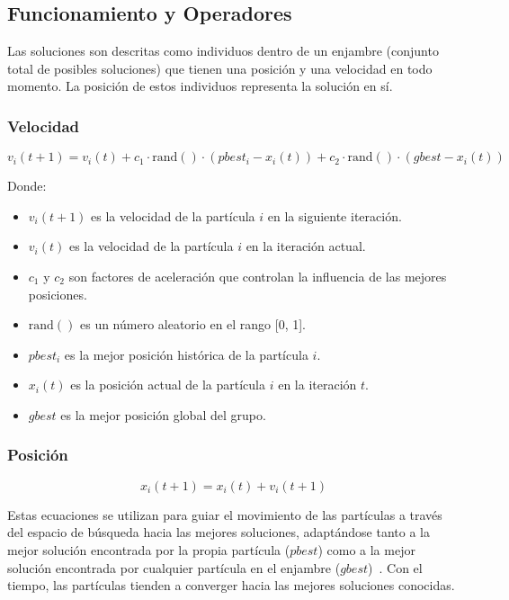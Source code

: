 \subsection{Funcionamiento y Operadores}
Las soluciones son descritas como individuos dentro de un enjambre (conjunto total de posibles soluciones) que tienen una posición y una velocidad en todo momento. La posición de estos individuos representa la solución en sí.

\subsubsection{Velocidad}
\begin{equation}
    v_{i}(t+1) = v_{i}(t) + c_1 \cdot \text{rand}() \cdot (pbest_{i} - x_{i}(t))+ c_2 \cdot \text{rand}() \cdot (gbest - x_{i}(t))
\end{equation}

Donde:
\begin{itemize}
    \item $v_{i}(t+1)$ es la velocidad de la partícula $i$ en la siguiente iteración.
    \item $v_{i}(t)$ es la velocidad de la partícula $i$ en la iteración actual.
    \item $c_1$ y $c_2$ son factores de aceleración que controlan la influencia de las mejores posiciones.
    \item $\text{rand}()$ es un número aleatorio en el rango [0, 1].
    \item $pbest_{i}$ es la mejor posición histórica de la partícula $i$.
    \item $x_{i}(t)$ es la posición actual de la partícula $i$ en la iteración $t$.
    \item $gbest$ es la mejor posición global del grupo.
\end{itemize}

\subsubsection{Posición}

\begin{equation}
    x_{i}(t+1) = x_{i}(t) + v_{i}(t+1)
\end{equation}

Estas ecuaciones se utilizan para guiar el movimiento de las partículas a través del espacio de búsqueda hacia las mejores soluciones, adaptándose tanto a la mejor solución encontrada por la propia partícula ($pbest$) como a la mejor solución encontrada por cualquier partícula en el enjambre ($gbest$)~\cite{kennedy_particle_1995}. Con el tiempo, las partículas tienden a converger hacia las mejores soluciones conocidas.

